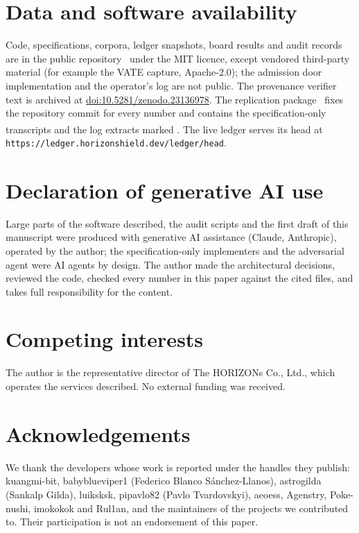 \documentclass[11pt,a4paper]{article}
\newcommand{\code}[1]{\texttt{#1}}
\newcommand{\priv}{\textsuperscript{\textdagger}}
\begin{document}
\section*{Data and software availability}
Code, specifications, corpora, ledger snapshots, board results and audit records are in the public repository~\citep{repo} under the MIT licence, except vendored third-party material (for example the VATE capture, Apache-2.0); the admission door implementation and the operator's log are not public. The provenance verifier text is archived at \href{https://doi.org/10.5281/zenodo.23136978}{doi:10.5281/zenodo.23136978}. The replication package~\citep{replication} fixes the repository commit for every number and contains the specification-only transcripts and the log extracts marked \priv. The live ledger serves its head at \code{https://ledger.horizonshield.dev/ledger/head}.

\section*{Declaration of generative AI use}
Large parts of the software described, the audit scripts and the first draft of this manuscript were produced with generative AI assistance (Claude, Anthropic), operated by the author; the specification-only implementers and the adversarial agent were AI agents by design. The author made the architectural decisions, reviewed the code, checked every number in this paper against the cited files, and takes full responsibility for the content.

\section*{Competing interests}
The author is the representative director of The HORIZONs Co., Ltd., which operates the services described. No external funding was received.

\section*{Acknowledgements}
We thank the developers whose work is reported under the handles they publish: kuangmi-bit, babyblueviper1 (Federico Blanco S\'anchez-Llanos), astrogilda (Sankalp Gilda), luiksksk, pipavlo82 (Pavlo Tvardovskyi), aeoess, Agenstry, Poke-nushi, imokokok and Rul1an, and the maintainers of the projects we contributed to. Their participation is not an endorsement of this paper.
\end{document}
